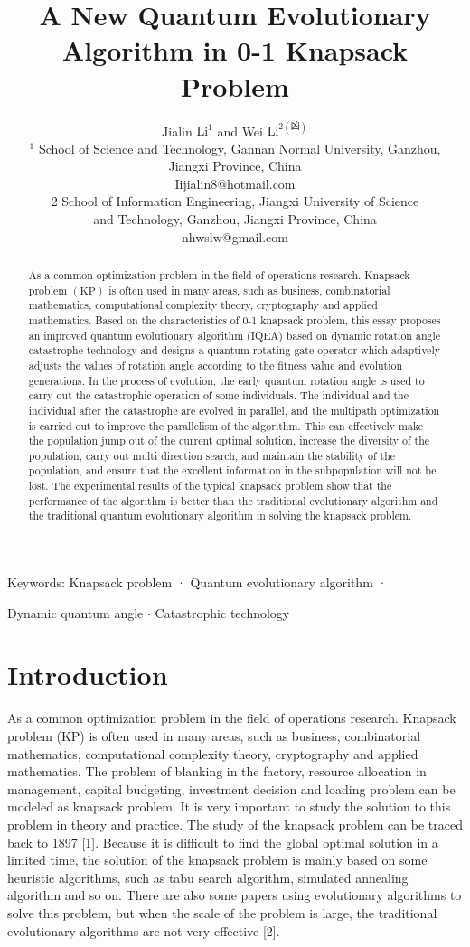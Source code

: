 \documentclass[10pt]{article}
\title{A New Quantum Evolutionary Algorithm in 0-1 Knapsack Problem }
\author{Jialin $\mathrm{Li}^{1}$ and Wei $\mathrm{Li}^{2(凶)}$\\
${ }^{1}$ School of Science and Technology, Gannan Normal University, Ganzhou,\\
Jiangxi Province, China\\
Iijialin8@hotmail.com\\
2 School of Information Engineering, Jiangxi University of Science\\
and Technology, Ganzhou, Jiangxi Province, China\\
nhwslw@gmail.com}
\date{}
\begin{document}
\maketitle


\begin{abstract}
As a common optimization problem in the field of operations research. Knapsack problem $(\mathrm{KP})$ is often used in many areas, such as business, combinatorial mathematics, computational complexity theory, cryptography and applied mathematics. Based on the characteristics of 0-1 knapsack problem, this essay proposes an improved quantum evolutionary algorithm (IQEA) based on dynamic rotation angle catastrophe technology and designs a quantum rotating gate operator which adaptively adjusts the values of rotation angle according to the fitness value and evolution generations. In the process of evolution, the early quantum rotation angle is used to carry out the catastrophic operation of some individuals. The individual and the individual after the catastrophe are evolved in parallel, and the multipath optimization is carried out to improve the parallelism of the algorithm. This can effectively make the population jump out of the current optimal solution, increase the diversity of the population, carry out multi direction search, and maintain the stability of the population, and ensure that the excellent information in the subpopulation will not be lost. The experimental results of the typical knapsack problem show that the performance of the algorithm is better than the traditional evolutionary algorithm and the traditional quantum evolutionary algorithm in solving the knapsack problem.
\end{abstract}

Keywords: Knapsack problem · Quantum evolutionary algorithm ·

Dynamic quantum angle $\cdot$ Catastrophic technology

\section{Introduction}
As a common optimization problem in the field of operations research. Knapsack problem (KP) is often used in many areas, such as business, combinatorial mathematics, computational complexity theory, cryptography and applied mathematics. The problem of blanking in the factory, resource allocation in management, capital budgeting, investment decision and loading problem can be modeled as knapsack problem. It is very important to study the solution to this problem in theory and practice. The study of the knapsack problem can be traced back to 1897 [1]. Because it is difficult to find the global optimal solution in a limited time, the solution of the knapsack problem is mainly based on some heuristic algorithms, such as tabu search algorithm, simulated annealing algorithm and so on. There are also some papers using evolutionary algorithms to solve this problem, but when the scale of the problem is large, the traditional evolutionary algorithms are not very effective [2].
\end{document}

